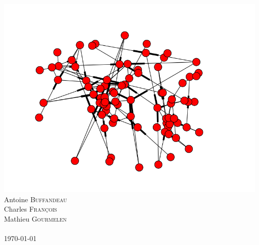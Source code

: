 \documentclass[12pt]{article}
\begin{document}
\begin{titlepage}
\includegraphics[scale=0.5]{network_stock_page_de_garde.png}\\
Antoine \textsc{Buffandeau}\\
Charles \textsc{François}\\
Mathieu \textsc{Gourmelen}\\
 \textsc{}
\\[1cm]
{\large \today} %
\vfill
\end{titlepage}
\tableofcontents
\hypertarget{sec:part1}{}
\end{document}
